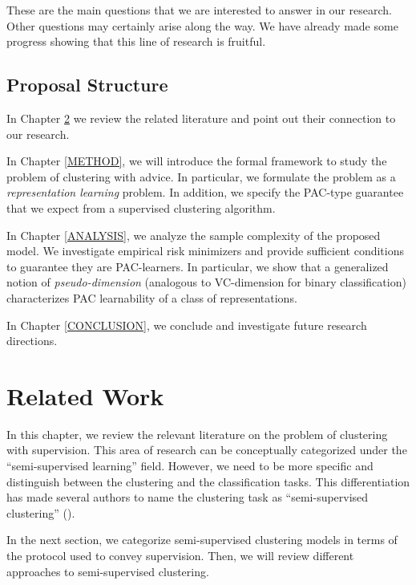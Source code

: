 \documentclass[letterpaper,12pt,titlepage,oneside,final]{book}
\begin{document}
These are the main questions that we are interested to answer in our research. Other questions may certainly arise along the way. We have already made some progress showing that this line of research is fruitful.



\section{Proposal Structure}

In Chapter \ref{RLW} we review the related literature and point out their connection to our research.

In Chapter \ref{METHOD}, we will introduce the formal framework to study the problem of clustering with advice. In particular, we formulate the problem as a \emph{representation learning} problem. In addition, we specify the PAC-type guarantee that we expect from a supervised clustering algorithm.

In Chapter \ref{ANALYSIS}, we analyze the sample complexity of the proposed model. We investigate empirical risk minimizers and provide sufficient conditions to guarantee they are PAC-learners. In particular, we show that a generalized notion of \emph{pseudo-dimension} (analogous to VC-dimension for binary classification) characterizes PAC learnability of a class of representations.

In Chapter \ref{CONCLUSION}, we conclude and investigate future research directions.

\chapter{Related Work}
\label{RLW}

In this chapter, we review the relevant literature on the problem of clustering with supervision. This area of research can be conceptually categorized under the ``semi-supervised learning'' field. However, we need to be more specific and distinguish between the clustering and the classification tasks. This differentiation has made several authors to name the clustering task as ``semi-supervised clustering'' (\cite{basu2002semi,basu2004probabilistic, kulis2009semi}).

In the next section, we categorize semi-supervised clustering models in terms of the protocol used to convey supervision. Then, we will review different approaches to semi-supervised clustering.
\end{document}
